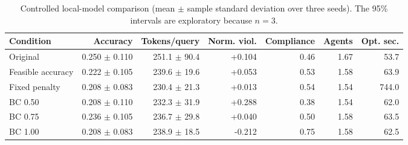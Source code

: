 \begin{table}[t]
\centering
\caption{Controlled local-model comparison (mean $\pm$ sample standard deviation over three seeds). The 95\% intervals are exploratory because $n=3$.}
\label{tab:main-results}
\small
\begin{tabular}{lrrrrrr}
\hline
Condition & Accuracy & Tokens/query & Norm. viol. & Compliance & Agents & Opt. sec. \\
\hline
Original & 0.250 $\pm$ 0.110 & 251.1 $\pm$ 90.4 & +0.104 & 0.46 & 1.67 & 53.7 \\
Feasible accuracy & 0.222 $\pm$ 0.105 & 239.6 $\pm$ 19.6 & +0.053 & 0.53 & 1.58 & 63.9 \\
Fixed penalty & 0.208 $\pm$ 0.083 & 230.4 $\pm$ 21.3 & +0.013 & 0.54 & 1.54 & 744.0 \\
BC 0.50 & 0.208 $\pm$ 0.110 & 232.3 $\pm$ 31.9 & +0.288 & 0.38 & 1.54 & 62.0 \\
BC 0.75 & 0.236 $\pm$ 0.105 & 236.7 $\pm$ 29.8 & +0.040 & 0.50 & 1.58 & 63.5 \\
BC 1.00 & 0.208 $\pm$ 0.083 & 238.9 $\pm$ 18.5 & -0.212 & 0.75 & 1.58 & 62.5 \\
\hline
\end{tabular}
\end{table}
